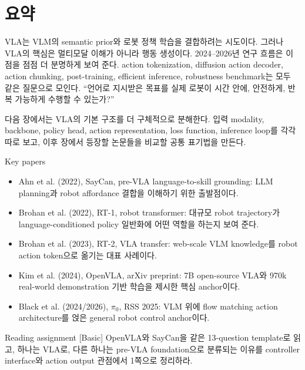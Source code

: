 \section{요약}

VLA는 VLM의 semantic prior와 로봇 정책 학습을 결합하려는 시도이다. 그러나 VLA의 핵심은 멀티모달 이해가 아니라 행동 생성이다. 2024--2026년 연구 흐름은 이 점을 점점 더 분명하게 보여 준다. action tokenization, diffusion action decoder, action chunking, post-training, efficient inference, robustness benchmark는 모두 같은 질문으로 모인다. ``언어로 지시받은 목표를 실제 로봇이 시간 안에, 안전하게, 반복 가능하게 수행할 수 있는가?''

다음 장에서는 VLA의 기본 구조를 더 구체적으로 분해한다. 입력 modality, backbone, policy head, action representation, loss function, inference loop를 각각 따로 보고, 이후 장에서 등장할 논문들을 비교할 공통 표기법을 만든다.

\begin{sourcebox}{Key papers}
\begin{itemize}
  \item Ahn et al. (2022), SayCan, pre-VLA language-to-skill grounding: LLM planning과 robot affordance 결합을 이해하기 위한 출발점이다.
  \item Brohan et al. (2022), RT-1, robot transformer: 대규모 robot trajectory가 language-conditioned policy 일반화에 어떤 역할을 하는지 보여 준다.
  \item Brohan et al. (2023), RT-2, VLA transfer: web-scale VLM knowledge를 robot action token으로 옮기는 대표 사례이다.
  \item Kim et al. (2024), OpenVLA, arXiv preprint: 7B open-source VLA와 970k real-world demonstration 기반 학습을 제시한 핵심 anchor이다.
  \item Black et al. (2024/2026), \(\pi_0\), RSS 2025: VLM 위에 flow matching action architecture를 얹은 general robot control anchor이다.
\end{itemize}
\end{sourcebox}

\begin{assignmentbox}{Reading assignment [Basic]}
OpenVLA와 SayCan을 같은 13-question template로 읽고, 하나는 VLA로, 다른 하나는 pre-VLA foundation으로 분류되는 이유를 controller interface와 action output 관점에서 1쪽으로 정리하라.
\end{assignmentbox}
